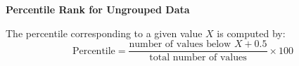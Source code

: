 \begin{center}
\textbf{Percentile Rank for Ungrouped Data}
\end{center}

\vspace*{1ex}

The percentile corresponding to a given value $X$ is computed by: 
$$
\text{Percentile} = \dfrac{\text{number of values below } X + 0.5}{\text{total number of values}} \times 100 
$$




